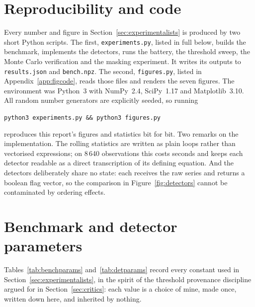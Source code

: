 \section{Reproducibility and code}
\label{app:code}

\begin{sloppypar}
Every number and figure in Section~\ref{sec:experimentalists} is produced by
two short Python scripts. The first, \texttt{experiments.py}, listed in full
below, builds the benchmark, implements the detectors, runs the battery, the
threshold sweep, the Monte Carlo verification and the masking experiment.
It writes its outputs to \texttt{results.json} and \texttt{bench.npz}. The
second, \texttt{figures.py}, listed in Appendix~\ref{app:figcode}, reads
those files and renders the seven figures. The environment was Python~3 with
NumPy~2.4, SciPy~1.17 and Matplotlib~3.10. All random number generators are
explicitly seeded, so running
\end{sloppypar}

\begin{center}
\texttt{python3 experiments.py \&\& python3 figures.py}
\end{center}

reproduces this report's figures and statistics bit for bit. Two remarks on
the implementation. The rolling statistics are written as plain loops rather
than vectorised expressions; on 8\,640 observations this costs seconds and
keeps each detector readable as a direct transcription of its defining
equation. And the detectors deliberately share no state: each receives the
raw series and returns a boolean flag vector, so the comparison in
Figure~\ref{fig:detectors} cannot be contaminated by ordering effects.



\clearpage
\section{Benchmark and detector parameters}
\label{app:params}

Tables~\ref{tab:benchparams} and~\ref{tab:detparams} record every constant
used in Section~\ref{sec:experimentalists}, in the spirit of the threshold
provenance discipline argued for in Section~\ref{sec:critics}: each value is
a choice of mine, made once, written down here, and inherited by nothing.

